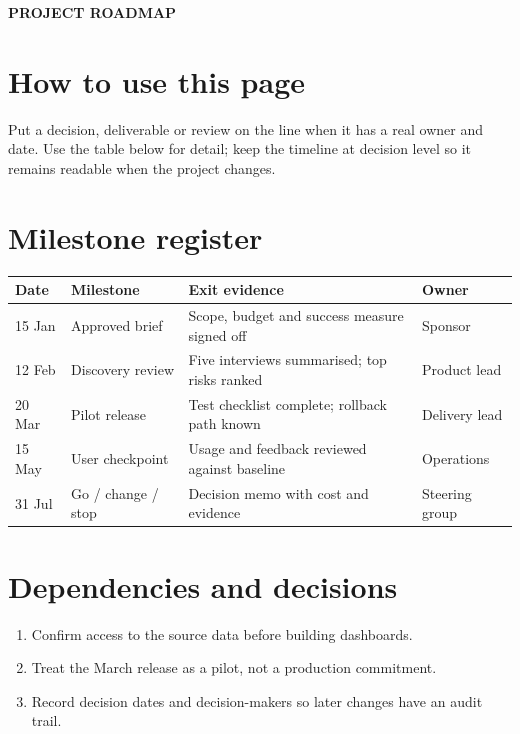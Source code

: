 \documentclass[11pt,a4paper]{article}
\begin{document}
\begin{center}{\color{navy}\Huge\bfseries PROJECT ROADMAP}\par\vspace{.2cm}{\large A quarterly calendar for visible dependencies}\end{center}
\section*{How to use this page} Put a decision, deliverable or review on the line when it has a real owner and date. Use the table below for detail; keep the timeline at decision level so it remains readable when the project changes.
\begin{center}\end{center}
\section*{Milestone register}\begin{tabularx}{\textwidth}{p{}p{}X p{}}\toprule Date & Milestone & Exit evidence & Owner\\\midrule 15 Jan & Approved brief & Scope, budget and success measure signed off & Sponsor\\12 Feb & Discovery review & Five interviews summarised; top risks ranked & Product lead\\20 Mar & Pilot release & Test checklist complete; rollback path known & Delivery lead\\15 May & User checkpoint & Usage and feedback reviewed against baseline & Operations\\31 Jul & Go / change / stop & Decision memo with cost and evidence & Steering group\\\bottomrule\end{tabularx}
\section*{Dependencies and decisions}\begin{enumerate}\item Confirm access to the source data before building dashboards.\item Treat the March release as a pilot, not a production commitment.\item Record decision dates and decision-makers so later changes have an audit trail.\end{enumerate}
\end{document}
